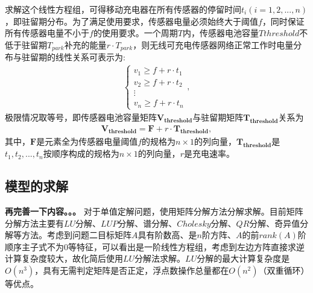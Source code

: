 \documentclass{whutmod}
\begin{document}
			求解这个线性方程组，可得移动充电器在所有传感器的停留时间$t_i(i=1,2,...,n)$，即驻留期分布。为了满足使用要求，传感器电量必须始终大于阈值$f$，同时保证所有传感器电量不小于$f$的使用要求。一个周期$T$内，传感器电池容量$T{threshold}$不低于驻留期$T_{park}$补充的能量$r \cdot T_{park}$，则无线可充电传感器网络正常工作时电量分布与驻留期的线性关系可表示为:
			\begin{gather}
			\left\{\begin{matrix}
			v_1\geq f+r\cdot t_1\\ 
			v_2\geq f+r\cdot t_2\\ 
			\vdots \\ 
			v_n \geq f+r\cdot t_n
			\end{matrix}\right.,
			\end{gather}
			极限情况取等号，即传感器电池容量矩阵$\bm {V_{threshold}}$与驻留期矩阵$\bm {T_{threshold}}$关系为
			\begin{gather}
			\bm{V_{threshold}}=\bm{F}+r\cdot \bm{T_{threshold}},
			\end{gather}
			其中，$\bm F$是元素全为传感器电量阈值$f$的规格为$n \times 1$的列向量，$\bm{T_{threshold}}$是$t_1,t_2,...,t_{n}$按顺序构成的规格为$n\times 1$的列向量，$r$是充电速率。
    		
		
		\subsection{模型的求解}
		\textbf{再完善一下内容。。。}
		对于单值定解问题，使用矩阵分解方法分解求解。目前矩阵分解方法主要有$LU$分解、$LUP$分解、谱分解、$Cholesky$分解、$QR$分解、奇异值分解等方法。考虑到问题二目标矩阵$A$具有阶数高、是$n$阶方阵、$A$的前$rank(A)$阶顺序主子式不为$0$等特征，可以看出是一阶线性方程组，考虑到左边方阵直接求逆计算复杂度较大，故化简后使用$LU$分解法求解。$LU$分解的最大计算复杂度是$O(n^3)$，具有无需判定矩阵是否正定，浮点数操作总量都在$O(n^2)$（双重循环）等优点。
		
\end{document}
